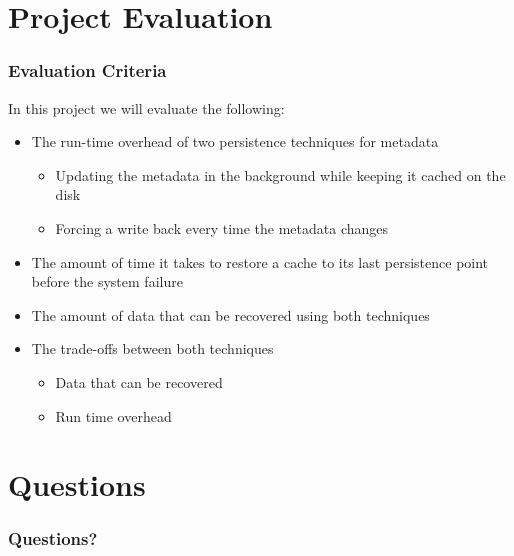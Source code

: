 \documentclass{beamer}
\begin{document}

\section{Project Evaluation}

\begin{frame}
  \frametitle{Evaluation Criteria}

  In this project we will evaluate the following:
  \begin{itemize}
    \item The run-time overhead of two persistence techniques for
    metadata
    \begin{itemize}
      \item Updating the metadata in the background while keeping it
      cached on the disk
      \item Forcing a write back every time the metadata changes
    \end{itemize}
    \item The amount of time it takes to restore a cache to its last
    persistence point before the system failure
    \item The amount of data that can be recovered using both
    techniques
    \item The trade-offs between both techniques
    \begin{itemize}
      \item Data that can be recovered
      \item Run time overhead
    \end{itemize}
  \end{itemize}

\end{frame}


\section{Questions}

\begin{frame}
  \frametitle{Questions?}
\end{frame}

\end{document}
